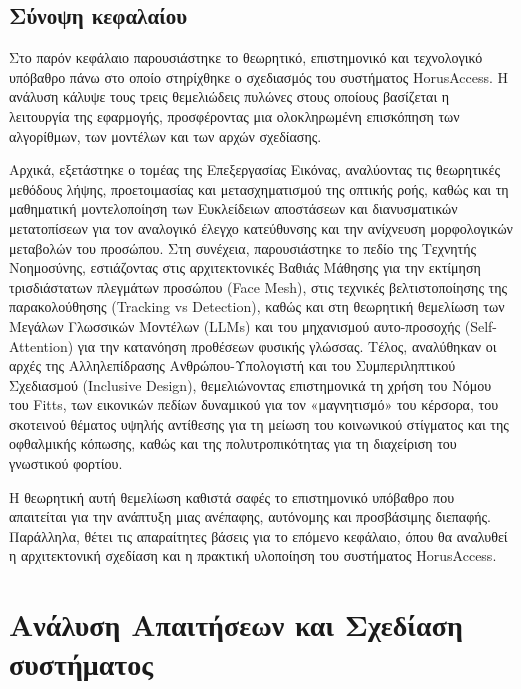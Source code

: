 \documentclass[twoside, a4paper, 11pt]{article}
\newcommand{\textlatin}[1]{\textenglish{#1}}
\begin{document}
\subsection{Σύνοψη κεφαλαίου}
Στο παρόν κεφάλαιο παρουσιάστηκε το θεωρητικό, επιστημονικό και τεχνολογικό υπόβαθρο πάνω στο οποίο στηρίχθηκε ο σχεδιασμός του συστήματος \textlatin{HorusAccess}. Η ανάλυση κάλυψε τους τρεις θεμελιώδεις πυλώνες στους οποίους βασίζεται η λειτουργία της εφαρμογής, προσφέροντας μια ολοκληρωμένη επισκόπηση των αλγορίθμων, των μοντέλων και των αρχών σχεδίασης.

Αρχικά, εξετάστηκε ο τομέας της Επεξεργασίας Εικόνας, αναλύοντας τις θεωρητικές μεθόδους λήψης, προετοιμασίας και μετασχηματισμού της οπτικής ροής, καθώς και τη μαθηματική μοντελοποίηση των Ευκλείδειων αποστάσεων και διανυσματικών μετατοπίσεων για τον αναλογικό έλεγχο κατεύθυνσης και την ανίχνευση μορφολογικών μεταβολών του προσώπου. Στη συνέχεια, παρουσιάστηκε το πεδίο της Τεχνητής Νοημοσύνης, εστιάζοντας στις αρχιτεκτονικές Βαθιάς Μάθησης για την εκτίμηση τρισδιάστατων πλεγμάτων προσώπου (\textlatin{Face Mesh}), στις τεχνικές βελτιστοποίησης της παρακολούθησης (\textlatin{Tracking vs Detection}), καθώς και στη θεωρητική θεμελίωση των Μεγάλων Γλωσσικών Μοντέλων (\textlatin{LLMs}) και του μηχανισμού αυτο-προσοχής (\textlatin{Self-Attention}) για την κατανόηση προθέσεων φυσικής γλώσσας. Τέλος, αναλύθηκαν οι αρχές της Αλληλεπίδρασης Ανθρώπου-Υπολογιστή και του Συμπεριληπτικού Σχεδιασμού (\textlatin{Inclusive Design}), θεμελιώνοντας επιστημονικά τη χρήση του Νόμου του \textlatin{Fitts}, των εικονικών πεδίων δυναμικού για τον «μαγνητισμό» του κέρσορα, του σκοτεινού θέματος υψηλής αντίθεσης για τη μείωση του κοινωνικού στίγματος και της οφθαλμικής κόπωσης, καθώς και της πολυτροπικότητας για τη διαχείριση του γνωστικού φορτίου.

Η θεωρητική αυτή θεμελίωση καθιστά σαφές το επιστημονικό υπόβαθρο που απαιτείται για την ανάπτυξη μιας ανέπαφης, αυτόνομης και προσβάσιμης διεπαφής. Παράλληλα, θέτει τις απαραίτητες βάσεις για το επόμενο κεφάλαιο, όπου θα αναλυθεί η αρχιτεκτονική σχεδίαση και η πρακτική υλοποίηση του συστήματος \textlatin{HorusAccess}.

\clearpage
\section{Ανάλυση Απαιτήσεων και Σχεδίαση συστήματος}
\end{document}
